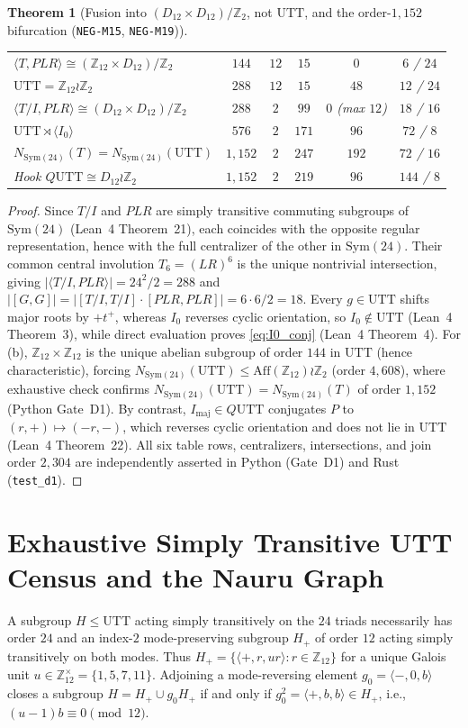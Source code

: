 \documentclass[11pt]{amsart}
\numberwithin{equation}{section}
\theoremstyle{plain}
\newtheorem{theorem}{Theorem}[section]
\theoremstyle{definition}\newtheorem{definition}[theorem]{Definition}
\theoremstyle{remark}\newtheorem{remark}[theorem]{Remark}
\newcommand{\Z}{\mathbb{Z}}
\newcommand{\UTT}{\mathrm{UTT}}
\begin{document}
\begin{theorem}[Fusion into $(D_{12}\times D_{12})/\Z_2$, not $\UTT$, and the order-$1{,}152$ bifurcation (\texttt{NEG-M15}, \texttt{NEG-M19})]
\begin{center}
\begin{tabular}{lccccc}
$\langle T, PLR\rangle\cong(\Z_{12}{\times}D_{12})/\Z_2$ & $144$ & $12$ & $15$ & $0$ & $6$ / $24$ \\
$\UTT = \Z_{12}\wr\Z_2$ & $288$ & $12$ & $15$ & $48$ & $12$ / $24$ \\
$\langle T/I, PLR\rangle\cong (D_{12}{\times}D_{12})/\Z_2$ & $288$ & $2$ & $99$ & $0$ (max $12$) & $18$ / $16$ \\
$\UTT\rtimes\langle I_0\rangle$ & $576$ & $2$ & $171$ & $96$ & $72$ / $8$ \\
$N_{\mathrm{Sym}(24)}(T)=N_{\mathrm{Sym}(24)}(\UTT)$ & $1{,}152$ & $2$ & $247$ & $192$ & $72$ / $16$ \\
Hook $Q\UTT\cong D_{12}\wr\Z_2$ & $1{,}152$ & $2$ & $219$ & $96$ & $144$ / $8$ \\\bottomrule
\end{tabular}
\end{center}
\end{theorem}
\begin{proof}
Since $T/I$ and $PLR$ are simply transitive commuting subgroups of $\mathrm{Sym}(24)$ (Lean~4 Theorem~21), each coincides with the opposite regular representation, hence with the full centralizer of the other in $\mathrm{Sym}(24)$. Their common central involution $T_6=(LR)^6$ is the unique nontrivial intersection, giving $|\langle T/I,PLR\rangle|=24^2/2=288$ and $|[G,G]|=|[T/I,T/I]\cdot[PLR,PLR]|=6\cdot 6/2=18$. Every $g\in\UTT$ shifts major roots by $+t^+$, whereas $I_0$ reverses cyclic orientation, so $I_0\notin\UTT$ (Lean~4 Theorem~3), while direct evaluation proves \eqref{eq:I0_conj} (Lean~4 Theorem~4). For (b), $\Z_{12}\times\Z_{12}$ is the unique abelian subgroup of order $144$ in $\UTT$ (hence characteristic), forcing $N_{\mathrm{Sym}(24)}(\UTT)\le\mathrm{Aff}(\Z_{12})\wr\Z_2$ (order $4{,}608$), where exhaustive check confirms $N_{\mathrm{Sym}(24)}(\UTT)=N_{\mathrm{Sym}(24)}(T)$ of order $1{,}152$ (Python Gate~D1). By contrast, $I_{\mathrm{maj}}\in Q\UTT$ conjugates $P$ to $(r,+)\mapsto (-r,-)$, which reverses cyclic orientation and does not lie in $\UTT$ (Lean~4 Theorem~22). All six table rows, centralizers, intersections, and join order $2{,}304$ are independently asserted in Python (Gate~D1) and Rust (\texttt{test\_d1}).
\end{proof}

\section{Exhaustive Simply Transitive UTT Census and the Nauru Graph}\label{sec:census}
A subgroup $H\le\UTT$ acting simply transitively on the $24$ triads necessarily has order $24$ and an index-$2$ mode-preserving subgroup $H_+$ of order $12$ acting simply transitively on both modes. Thus $H_+ = \{\langle +, r, u r\rangle : r\in\Z_{12}\}$ for a unique Galois unit $u\in\Z_{12}^\times=\{1,5,7,11\}$. Adjoining a mode-reversing element $g_0=\langle -,0,b\rangle$ closes a subgroup $H=H_+\cup g_0 H_+$ if and only if $g_0^2=\langle +,b,b\rangle\in H_+$, i.e., $(u-1)b\equiv 0\pmod{12}$.
\end{document}
